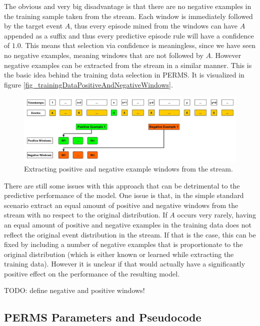 The obvious and very big disadvantage is that there are no negative examples in the training sample taken from the stream. Each window is immediately followed by the target event $A$, thus every episode mined from the windows can have $A$ appended as a suffix and thus every predictive episode rule will have a confidence of $1.0$. This means that selection via confidence is meaningless, since we have seen no negative examples, meaning windows that are not followed by $A$. However negative examples can be extracted from the stream in a similar manner. This is the basic idea behind the training data selection in PERMS. It is visualized in figure \ref{fig_trainingDataPositiveAndNegativeWindows}. 

\begin{figure}[h]
	\centering
  	\includegraphics[width=\textwidth]{trainingDataPositiveAndNegativeWindows}
	\caption{Extracting positive and negative example windows from the stream.}
	\label{fig_trainingDataNaive}
\end{figure}

There are still some issues with this approach that can be detrimental to the predictive performance of the model. One issue is that, in the simple standard scenario extract an equal amount of positive and negative windows from the stream with no respect to the original distribution. If $A$ occurs very rarely, having an equal amount of positive and negative examples in the training data does not reflect the original event distribution in the stream. If that is the case, this can be fixed by including a number of negative examples that is proportionate to the original distribution (which is either known or learned while extracting the training data). However it is unclear if that would actually have a significantly positive effect on the performance of the resulting model.



TODO: define negative and positive windows!




\subsection{PERMS Parameters and Pseudocode}

